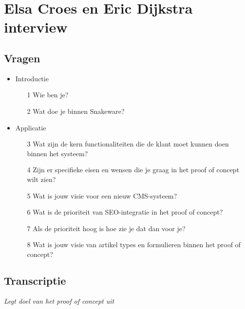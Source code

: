 \section{Elsa Croes en Eric Dijkstra interview}
\label{appendix:ExploreUserRequirementsElsa}

\subsection*{Vragen}
\begin{itemize}
    \item{Introductie}
    \begin{itemize}
        \item[1]{Wie ben je?}
        \item[2]{Wat doe je binnen Snakeware?}
    \end{itemize}
    \item{Applicatie}
    \begin{itemize}
        \item[3]{Wat zijn de kern functionaliteiten die de klant moet kunnen doen binnen het systeem?}
        \item[4]{Zijn er specifieke eisen en wensen die je graag in het proof of concept wilt zien?}
        \item[5]{Wat is jouw visie voor een nieuw CMS-systeem?}
        \item[6]{Wat is de prioriteit van SEO-integratie in het proof of concept?}
        \item[7]{Als de prioriteit hoog is hoe zie je dat dan voor je?}
        \item[8]{Wat is jouw visie van artikel types en formulieren binnen het proof of concept?}
    \end{itemize}
\end{itemize}


\subsection*{Transcriptie}




\begin{center}
	\textit{Legt doel van het proof of concept uit}
\end{center}

